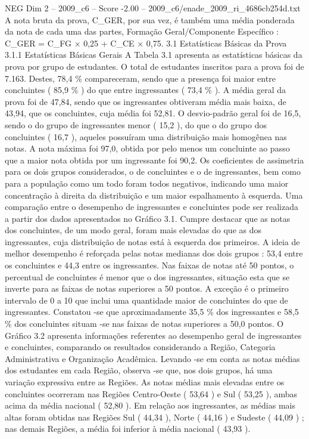 \begin{textsample}{NEG Dim 2 – 2009\_c6 – Score -2.00 – 2009\_c6/enade\_2009\_ri\_4686cb254d.txt}
A nota bruta da prova, C\_GER, por sua vez, é também uma média ponderada da nota de cada uma das partes, Formação Geral/Componente Específico : C\_GER = C\_FG × 0,25 + C\_CE × 0,75. 3.1 Estatísticas Básicas da Prova 3.1.1 Estatísticas Básicas Gerais A Tabela 3.1 apresenta as estatísticas básicas da prova por grupo de estudantes.
O total de estudantes inscritos para a prova foi de 7.163.
Destes, 78,4 \% compareceram, sendo que a presença foi maior entre concluintes ( 85,9 \% ) do que entre ingressantes ( 73,4 \% ).
A média geral da prova foi de 47,84, sendo que os ingressantes obtiveram média mais baixa, de 43,94, que os concluintes, cuja média foi 52,81.
O desvio-padrão geral foi de 16,5, sendo o do grupo de ingressantes menor ( 15,2 ), do que o do grupo dos concluintes ( 16,7 ), aqueles possuíram uma distribuição mais homogênea nas notas.
A nota máxima foi 97,0, obtida por pelo menos um concluinte ao passo que a maior nota obtida por um ingressante foi 90,2.
Os coeficientes de assimetria para os dois grupos considerados, o de concluintes e o de ingressantes, bem como para a população como um todo foram todos negativos, indicando uma maior concentração à direita da distribuição e um maior espalhamento à esquerda.
Uma comparação entre o desempenho de ingressantes e concluintes pode ser realizada a partir dos dados apresentados no Gráfico 3.1.
Cumpre destacar que as notas dos concluintes, de um modo geral, foram mais elevadas do que as dos ingressantes, cuja distribuição de notas está à esquerda dos primeiros.
A ideia de melhor desempenho é reforçada pelas notas medianas dos dois grupos : 53,4 entre os concluintes e 44,3 entre os ingressantes.
Nas faixas de notas até 50 pontos, o percentual de concluintes é menor que o dos ingressantes, situação esta que se inverte para as faixas de notas superiores a 50 pontos.
A exceção é o primeiro intervalo de 0 a 10 que inclui uma quantidade maior de concluintes do que de ingressantes.
Constatou -se que aproximadamente 35,5 \% dos ingressantes e 58,5 \% dos concluintes situam -se nas faixas de notas superiores a 50,0 pontos.
O Gráfico 3.2 apresenta informações referentes ao desempenho geral de ingressantes e concluintes, comparando os resultados considerando a Região, Categoria Administrativa e Organização Acadêmica.
Levando -se em conta as notas médias dos estudantes em cada Região, observa -se que, nos dois grupos, há uma variação expressiva entre as Regiões.
As notas médias mais elevadas entre os concluintes ocorreram nas Regiões Centro-Oeste ( 53,64 ) e Sul ( 53,25 ), ambas acima da média nacional ( 52,80 ).
Em relação aos ingressantes, as médias mais altas foram obtidas nas Regiões Sul ( 44,34 ), Norte ( 44,16 ) e Sudeste ( 44,09 ) ; nas demais Regiões, a média foi inferior à média nacional ( 43,93 ).

\end{textsample}
